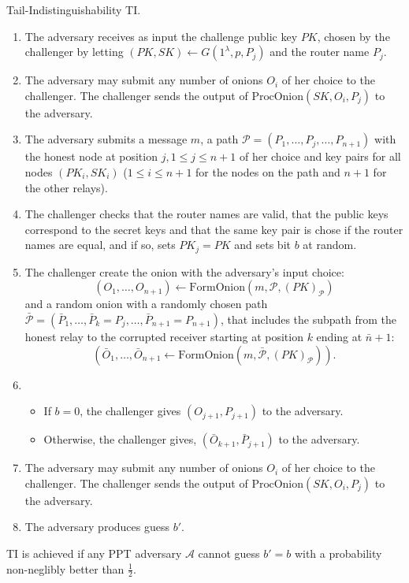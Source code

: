 \begin{definition}{Tail-Indistinguishability TI.}
  \begin{enumerate}
    \item{The adversary receives as input the challenge public key
      \(PK\), chosen by the challenger by letting \((PK,SK) \leftarrow
      G(1^\lambda, p, P_j)\) and the router name \(P_j\).}
    \item{The adversary may submit any number of onions \(O_i\) of her
      choice to the challenger. The challenger sends the output of
      \(\text{ProcOnion}(SK, O_i, P_j)\) to the adversary.}
    \item{The adversary submits a message \(m\), a path \(\mathcal{P}
      = (P_1, \ldots, P_j, \ldots, P_{n+1})\) with the honest node at
      position \(j, 1\leq j \leq n+1\) of her choice and key pairs for
      all nodes \((PK_i,SK_i)\) (\(1\leq i \leq n+1\) for the nodes on
      the path and \(n+1\) for the other relays).}
    \item{The challenger checks that the router names are valid, that
      the public keys correspond to the secret keys and that the same
      key pair is chose if the router names are equal, and if so, sets
      \(PK_j = PK\) and sets bit \(b\) at random.}
    \item{The challenger create the onion with the adversary's input
      choice:
      \[ (O_1, \ldots, O_{n+1}) \leftarrow \text{FormOnion}(m,
      \mathcal{P}, (PK)_{\mathcal{P}})
      \]
      and a random onion with a randomly chosen path
      \(\bar{\mathcal{P}} = (\bar{P}_1, \ldots, \bar{P}_k = P_j,
      \ldots, \bar{P}_{n+1} = P_{n+1})\), that includes the subpath
      from the honest relay to the corrupted receiver starting at
      position \(k\) ending at \(\bar{n} +1 \):
      \[ (\bar{O}_1, \ldots, \bar{O}_{n+1} \leftarrow
      \text{FormOnion}(m, \bar{\mathcal{P}}, (PK)_{\mathcal{P}})).
      \]}
    \item{
      \begin{itemize}
        \item{If \(b = 0\), the challenger gives \((O_{j+1},
          P_{j+1})\) to the adversary.}
        \item{Otherwise, the challenger gives, \((\bar{O}_{k+1},
          \bar{P}_{j+1})\) to the adversary.}
      \end{itemize}
    }
    \item{ The adversary may submit any number of onions \(O_i\) of
      her choice to the challenger. The challenger sends the output of
      \(\text{ProcOnion}(SK,O_i, P_j)\) to the adversary.}
    \item{The adversary produces guess \(b'\).}
  \end{enumerate}
  TI is achieved if any PPT adversary \(\mathcal{A}\) cannot guess
  \(b' = b\) with a probability non-neglibly better than \(\frac{1}{2}\).
\end{definition}

